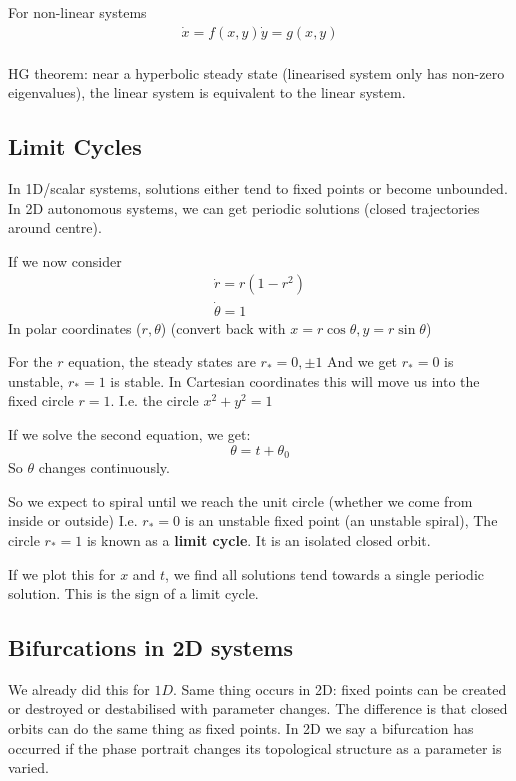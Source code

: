 \documentclass{X:/Documents/Coding/Latex/myassignment}
\begin{document}
For non-linear systems
\begin{align*}
    \dot{x} = f(x,y)
    \dot{y} = g(x,y)\\
\end{align*}

HG theorem: near a hyperbolic steady state (linearised system only has non-zero eigenvalues), the linear system is equivalent to the linear system.



\subsection{Limit Cycles}
In 1D/scalar systems, solutions either tend to fixed points or become unbounded.\\
In 2D autonomous systems, we can get periodic solutions (closed trajectories around centre).

If we now consider
\begin{align*}
    \dot{r} = r(1-r^2)\\
    \dot{\theta} = 1
\end{align*}
In polar coordinates ($r,\theta$) (convert back with $x = r\cos\theta, y= r\sin \theta$)

For the $r$ equation, the steady states are $r_* = 0,\pm1 $
And we get $r_* = 0$ is unstable, $r_* = 1$ is stable.
In Cartesian coordinates this will move us into the fixed circle $r=1$. I.e. the circle $x^2 + y^2 = 1$

If we solve the second equation, we get:
\[\theta = t + \theta_0\]
So $\theta$ changes continuously.

So we expect to spiral until we reach the unit circle (whether we come from inside or outside)
I.e. $r_* =0$ is an unstable fixed point (an unstable spiral), 
The circle $r_*=1$ is known as a \textbf{limit cycle}. It is an isolated closed orbit.


If we plot this for $x$ and $t$, we find all solutions tend towards a single periodic solution. This is the sign of a limit cycle.


\subsection{Bifurcations in 2D systems}
We already did this for $1D$. Same thing occurs in 2D: fixed points can be created or destroyed or destabilised with parameter changes. The difference is that closed orbits can do the same thing as fixed points. In 2D we say a bifurcation has occurred if the phase portrait changes its topological structure as a parameter is varied. 
\end{document}
